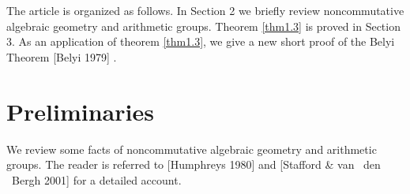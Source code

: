 \documentclass[10pt, reqno]{amsart}
\theoremstyle{definition}
\theoremstyle{remark}
\numberwithin{equation}{section}
\begin{document}
The article is organized as follows. In Section 2 we briefly review 
noncommutative algebraic geometry and arithmetic groups.  
Theorem \ref{thm1.3} is proved  in Section 3. 
As an application of theorem \ref{thm1.3},  we give a new short proof of the Belyi Theorem 
 [Belyi 1979] \cite[Theorem 4]{Bel1}. 









\section{Preliminaries}
We  review some facts of noncommutative algebraic geometry and 
 arithmetic groups. The reader is referred to [Humphreys 1980] \cite{H} and 
[Stafford \& van ~den ~Bergh 2001]  \cite{StaVdb1} for a detailed account.  


\end{document}
